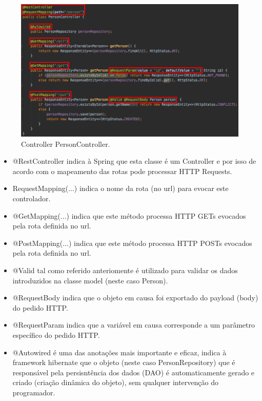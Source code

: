 \begin{figure}[H]
    \centering
    \includegraphics[scale=0.5]{images/PersonController.png}
    \caption{Controller PersonController.}
    \label{fig:grails}
\end{figure}

\begin{itemize}
    
    \item @RestController indica à Spring que esta classe é um Controller e por isso de acordo com o mapeamento das rotas pode processar HTTP Requests.
    
    \item RequestMapping(...) indica o nome da rota (no url) para evocar este controlador.
    
    \item @GetMapping(...) indica que este método processa HTTP GETs evocados pela rota definida no url.
    
    \item @PostMapping(...) indica que este método processa HTTP POSTs evocados pela rota definida no url.
    
    \item @Valid tal como referido anteriomente é utilizado para validar os dados introduzidos na classe model (neste caso Person). 
    
    \item @RequestBody indica que o objeto em causa foi exportado do payload (body) do pedido HTTP.
    
    \item @RequestParam indica que a variável em causa corresponde a um parâmetro específico do pedido HTTP.
    
    \item @Autowired é uma das anotações mais importante e eficaz, indica à framework hibernate que o objeto (neste caso PersonRepository) que é responsável pela persisntência dos dados (DAO) é automaticamente gerado e criado (criação dinâmica do objeto), sem qualquer intervenção do programador.
    
\end{itemize}

